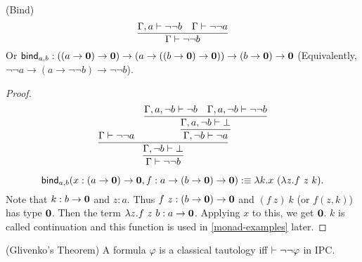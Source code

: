 \newcommand{\bind}{\name{bind}}
\begin{lemma}
    \label{bind-ipc}
    (Bind)
    $$
        \infer{\Gamma\proves\neg\neg b}{
            \Gamma,a\proves\neg\neg b
             & \Gamma\proves\neg\neg a
        }
    $$
    Or $\bind_{a,b}:((a\to \zero)\to\zero)\to(a\to((b\to \zero)\to \zero))\to (b\to \zero)\to \zero$
    (Equivalently, $\neg\neg a\to (a\to \neg\neg b)\to \neg\neg b$).
\end{lemma}
\begin{proof}
    $$
    \infer{\Gamma\proves\neg\neg b}{\infer{\Gamma,\neg b\proves\bot}{
        \Gamma\proves\neg\neg a &
        \infer{\Gamma,\neg b\proves\neg a}{
            \infer{\Gamma,a,\neg b\proves\bot}{
                \Gamma,a,\neg b\proves\neg b
                &
                \Gamma,a,\neg b\proves\neg\neg b
            }
        }
    }}
    $$

    $$
    \bind_{a,b}(x:(a\to\zero)\to \zero, f: a\to(b\to \zero)\to\zero)
    \defn \lambda k. x\ (\lambda z. f\ z\ k).
    $$
    Note that $k: b\to \mathbf{0}$ and $z: a$. Thus $f\ z:(b\to\mathbf{0})\to\mathbf{0}$
    and $(f\ z)\ k$ (or $f(z,k)$) has type $\mathbf{0}$. Then the term
    $\lambda z.f\ z\ b: a\to\mathbf{0}$. Applying $x$ to this, we get $\mathbf{0}$.
    $k$ is called continuation and this function is used in 
    \autoref{monad-examples} later.
\end{proof}
\begin{theorem}
    \label{glivenko-theorem}
    (Glivenko's Theorem) A formula $\varphi$ is a classical tautology
    iff $\vdash\neg\neg\varphi$ in IPC. 
\end{theorem}
